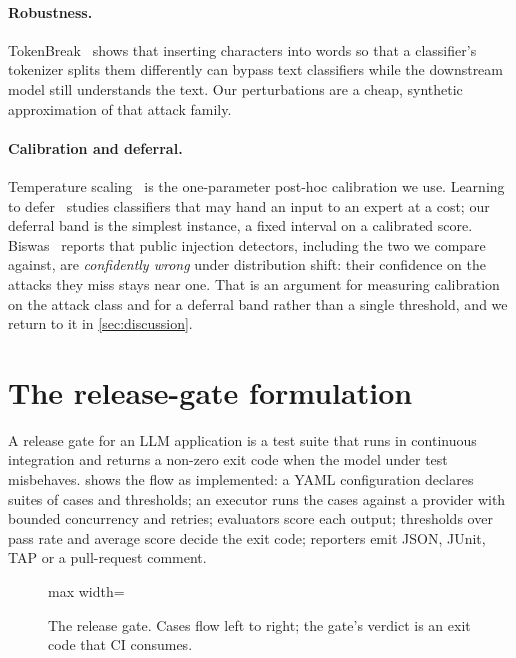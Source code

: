 \documentclass[10pt,a4paper]{article}
\begin{document}
\paragraph{Robustness.} TokenBreak~\cite{schulz2025tokenbreak} shows that inserting characters into words so that a classifier's tokenizer splits them differently can bypass text classifiers while the downstream model still understands the text. Our perturbations are a cheap, synthetic approximation of that attack family.

\paragraph{Calibration and deferral.} Temperature scaling~\cite{guo2017calibration} is the one-parameter post-hoc calibration we use. Learning to defer~\cite{madras2018predict,mozannar2020consistent} studies classifiers that may hand an input to an expert at a cost; our deferral band is the simplest instance, a fixed interval on a calibrated score. Biswas~\cite{biswas2026confidently} reports that public injection detectors, including the two we compare against, are \emph{confidently wrong} under distribution shift: their confidence on the attacks they miss stays near one. That is an argument for measuring calibration on the attack class and for a deferral band rather than a single threshold, and we return to it in \cref{sec:discussion}.

\section{The release-gate formulation}
\label{sec:gate}

A release gate for an LLM application is a test suite that runs in continuous integration and returns a non-zero exit code when the model under test misbehaves.  shows the flow as implemented: a YAML configuration declares suites of cases and thresholds; an executor runs the cases against a provider with bounded concurrency and retries; evaluators score each output; thresholds over pass rate and average score decide the exit code; reporters emit JSON, JUnit, TAP or a pull-request comment.

\begin{figure}[t]
\centering
\begin{adjustbox}{max width=\linewidth}

\end{adjustbox}
\caption{The release gate. Cases flow left to right; the gate's verdict is an exit code that CI consumes.}
\label{fig:gate}
\end{figure}
\end{document}
